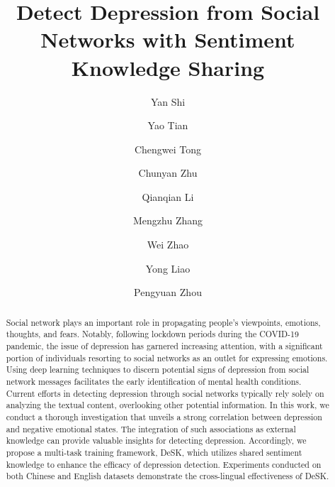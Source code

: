 \documentclass[runningheads]{llncs}
\begin{document}
%
\title{Detect Depression from Social Networks with Sentiment Knowledge Sharing}
%
%
\author{Yan Shi \and
Yao Tian \and Chengwei Tong \and Chunyan Zhu \and
Qianqian Li \and Mengzhu Zhang \and Wei Zhao \and Yong Liao \and Pengyuan Zhou}
%
%
%
\maketitle              %
%
\begin{abstract}
Social network plays an important role in propagating people's viewpoints, emotions, thoughts, and fears. Notably, following lockdown periods during the COVID-19 pandemic, the issue of depression has garnered increasing attention, with a significant portion of individuals resorting to social networks as an outlet for expressing emotions. Using deep learning techniques to discern potential signs of depression from social network messages facilitates the early identification of mental health conditions. 
Current efforts in detecting depression through social networks typically rely solely on analyzing the textual content, overlooking other potential information. In this work, we conduct a thorough investigation that unveils a strong correlation between depression and negative emotional states. The integration of such associations as external knowledge can provide valuable insights for detecting depression. Accordingly, we propose a multi-task training framework, DeSK, which utilizes shared sentiment knowledge to enhance the efficacy of depression detection. Experiments conducted on both Chinese and English datasets demonstrate the cross-lingual effectiveness of DeSK.

\end{abstract}
%
%
%
\end{document}
